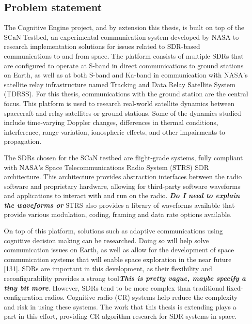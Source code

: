 \documentclass[11pt]{report}
\begin{document}
	\subsection{Problem statement}
	\par The Cognitive Engine project, and by extension this thesis, is built on top of the SCaN Testbed, an experimental communication system developed by NASA to research implementation solutions for issues related to SDR-based communications to and from space. The platform consists of multiple SDRs that are configured to operate at S-band in direct communications to ground stations on Earth, as well as at both S-band and Ka-band in communication with NASA's satellite relay infrastructure named Tracking and Data Relay Satellite System (TDRSS). For this thesis, communications with the ground station are the central focus. This platform is used to research real-world satellite dynamics between spacecraft and relay satellites or ground stations. Some of the dynamics studied include time-varying Doppler changes, differences in thermal conditions, interference, range variation, ionospheric effects, and other impairments to propagation.
	\par The SDRs chosen for the SCaN testbed are flight-grade systems, fully compliant with NASA's Space Telecommunications Radio System (STRS) SDR architecture. This architecture provides abstraction interfaces between the radio software and proprietary hardware, allowing for third-party software waveforms and applications to interact with and run on the radio. \textbf{\textit{Do I need to explain the waveforms or}} STRS also provides a library of waveforms available that provide various modulation, coding, framing and data rate options available. 
	\par On top of this platform, solutions such as adaptive communications using cognitive decision making can be researched. Doing so will help solve communication issues on Earth, as well as allow for the development of space communication systems that will enable space exploration in the near future [131]. SDRs are important in this development, as their flexibility and reconfigurability provides a strong tool\textbf{\textit{This is pretty vague, maybe specify a tiny bit more}}. However, SDRs tend to be more complex than traditional fixed-configuration radios. Cognitive radio (CR) systems help reduce the complexity and risk in using these systems. The work that this thesis is extending plays a part in this effort, providing CR algorithm research for SDR systems in space.    
\end{document}
